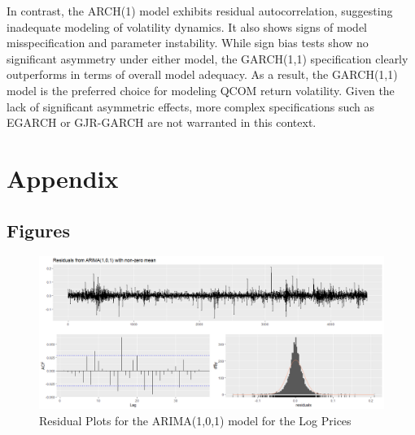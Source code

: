 \documentclass[12pt]{article}
\begin{document}
In contrast, the ARCH(1) model exhibits residual autocorrelation, suggesting inadequate modeling of volatility dynamics. It also shows signs of model misspecification and parameter instability. While sign bias tests show no significant asymmetry under either model, the GARCH(1,1) specification clearly outperforms in terms of overall model adequacy. As a result, the GARCH(1,1) model is the preferred choice for modeling QCOM return volatility. Given the lack of significant asymmetric effects, more complex specifications such as EGARCH or GJR-GARCH are not warranted in this context.

\section*{Appendix}
\begin{appendices}
\subsection*{Figures}
\begin{figure}[h]
	\centering
	\includegraphics[width=1\linewidth]{plots/residual_plot_1_1.png}
	\caption{Residual Plots for the ARIMA(1,0,1) model for the Log Prices}
	\label{fig:residual_plot_1_1}
\end{figure}

\end{appendices}
\end{document}
